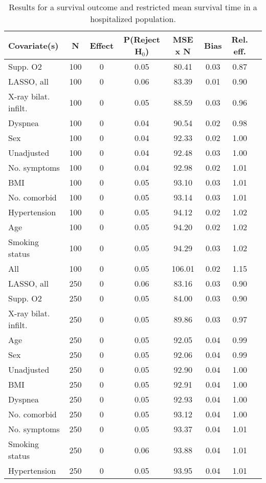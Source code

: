 \documentclass{article}
\begin{document}
\small
{\tabcolsep=6pt  %
\begin{longtable}{lccccccc}
\caption{Results for a survival outcome and restricted mean survival time in a hospitalized population.}\label{tab1}\\
Covariate(s) & N & Effect & P(Reject H$_0$) & MSE x N & Bias & Rel. eff.\\ \midrule
Supp. O2 & 100 & 0 & 0.05 & 80.41 & 0.03 & 0.87\\
LASSO, all & 100 & 0 & 0.06 & 83.39 & 0.01 & 0.90\\
X-ray bilat. infilt. & 100 & 0 & 0.05 & 88.59 & 0.03 & 0.96\\
Dyspnea & 100 & 0 & 0.04 & 90.54 & 0.02 & 0.98\\
Sex & 100 & 0 & 0.04 & 92.33 & 0.02 & 1.00\\
Unadjusted & 100 & 0 & 0.04 & 92.48 & 0.03 & 1.00\\
No. symptoms & 100 & 0 & 0.04 & 92.98 & 0.02 & 1.01\\
BMI & 100 & 0 & 0.05 & 93.10 & 0.03 & 1.01\\
No. comorbid & 100 & 0 & 0.05 & 93.14 & 0.03 & 1.01\\
Hypertension & 100 & 0 & 0.05 & 94.12 & 0.02 & 1.02\\
Age & 100 & 0 & 0.05 & 94.20 & 0.02 & 1.02\\
Smoking status & 100 & 0 & 0.05 & 94.29 & 0.03 & 1.02\\
All & 100 & 0 & 0.05 & 106.01 & 0.02 & 1.15\\ \midrule
LASSO, all & 250 & 0 & 0.06 & 83.16 & 0.03 & 0.90\\
Supp. O2 & 250 & 0 & 0.05 & 84.00 & 0.03 & 0.90\\
X-ray bilat. infilt. & 250 & 0 & 0.05 & 89.86 & 0.03 & 0.97\\
Age & 250 & 0 & 0.05 & 92.05 & 0.04 & 0.99\\
Sex & 250 & 0 & 0.05 & 92.06 & 0.04 & 0.99\\
Unadjusted & 250 & 0 & 0.05 & 92.90 & 0.04 & 1.00\\
BMI & 250 & 0 & 0.05 & 92.91 & 0.04 & 1.00\\
Dyspnea & 250 & 0 & 0.05 & 92.93 & 0.04 & 1.00\\
No. comorbid & 250 & 0 & 0.05 & 93.12 & 0.04 & 1.00\\
No. symptoms & 250 & 0 & 0.05 & 93.37 & 0.04 & 1.01\\
Smoking status & 250 & 0 & 0.06 & 93.88 & 0.04 & 1.01\\
Hypertension & 250 & 0 & 0.05 & 93.95 & 0.04 & 1.01\\

\end{longtable}}
\end{document}
